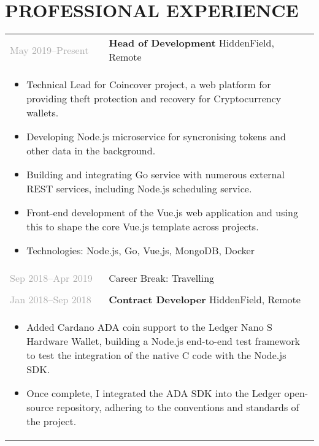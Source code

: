 \documentclass{article}
\newenvironment{exptable}{
  \begin{longtable}{lp{0.8\textwidth}}
  }{
  \end{longtable}
}
\begin{document}
  \section*{PROFESSIONAL EXPERIENCE}
    \begin{exptable}
      \textcolor{darkgray}{May 2019--Present}  & \textbf{Head of Development} HiddenField, Remote \\
      \multicolumn{2}{p{\textwidth}}{
        \begin{itemize}
          \item Technical Lead for Coincover project, a web platform for providing theft protection and recovery for Cryptocurrency wallets.
          \item Developing Node.js microservice for syncronising tokens and other data in the background.
          \item Building and integrating Go service with numerous external REST services, including Node.js scheduling service.
          \item Front-end development of the Vue.js web application and using this to shape the core Vue.js template across projects.
        \end{itemize}

        \vspace{1em}

        \begin{itemize}[leftmargin=1em]
          \item[] Technologies: Node.js, Go, Vue,js, MongoDB, Docker
        \end{itemize}
      } \\

      \textcolor{darkgray}{Sep 2018--Apr 2019} & Career Break: Travelling \\
      \multicolumn{2}{p{\textwidth}}{} \\

      \textcolor{darkgray}{Jan 2018--Sep 2018} & \textbf{Contract Developer} HiddenField, Remote \\
      \multicolumn{2}{p{\textwidth}}{
        \begin{itemize}
          \item Added Cardano ADA coin support to the Ledger Nano S Hardware Wallet, building a Node.js end-to-end test framework to test the integration of the native C code with the Node.js SDK.
          \item Once complete, I integrated the ADA SDK into the Ledger open-source repository, adhering to the conventions and standards of the project.
        \end{itemize}

}
\end{exptable}
\end{document}
